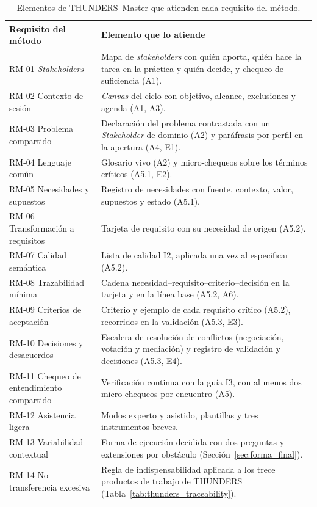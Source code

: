 \documentclass[12pt,letterpaper,oneside]{report}
\begin{document}
\begin{table}[H]
\caption{Elementos de THUNDERS~Master que atienden cada requisito del método.}
\label{tab:soporte_rm}
\centering
\footnotesize
\renewcommand{\arraystretch}{1.12}
\begin{tabularx}{\textwidth}{@{}L{4.4cm}Y@{}}
\toprule
\textbf{Requisito del método} & \textbf{Elemento que lo atiende} \\
\midrule
RM-01 \textit{Stakeholders} & Mapa de \textit{stakeholders} con quién aporta,
quién hace la tarea en la práctica y quién decide, y chequeo de suficiencia
(A1). \\
RM-02 Contexto de sesión & \textit{Canvas} del ciclo con objetivo, alcance,
exclusiones y agenda (A1, A3). \\
RM-03 Problema compartido & Declaración del problema contrastada con un \textit{Stakeholder} de dominio (A2)
y paráfrasis por perfil en la apertura (A4, E1). \\
RM-04 Lenguaje común & Glosario vivo (A2) y micro-chequeos sobre los términos
críticos (A5.1, E2). \\
RM-05 Necesidades y supuestos & Registro de necesidades con fuente, contexto,
valor, supuestos y estado (A5.1). \\
RM-06 Transformación a requisitos & Tarjeta de requisito con su necesidad de
origen (A5.2). \\
RM-07 Calidad semántica & Lista de calidad I2, aplicada una vez al especificar
(A5.2). \\
RM-08 Trazabilidad mínima & Cadena necesidad--requisito--criterio--decisión en
la tarjeta y en la línea base (A5.2, A6). \\
RM-09 Criterios de aceptación & Criterio y ejemplo de cada requisito crítico
(A5.2), recorridos en la validación (A5.3, E3). \\
RM-10 Decisiones y desacuerdos & Escalera de resolución de conflictos (negociación, votación y mediación)
y registro de validación y decisiones (A5.3, E4). \\
RM-11 Chequeo de entendimiento compartido & Verificación continua con la guía I3, con al
menos dos micro-chequeos por encuentro (A5). \\
RM-12 Asistencia ligera & Modos experto y asistido, plantillas y
tres instrumentos breves. \\
RM-13 Variabilidad contextual & Forma de ejecución decidida con dos preguntas y
extensiones por obstáculo (Sección~\ref{sec:forma_final}). \\
RM-14 No transferencia excesiva & Regla de indispensabilidad aplicada a los
trece productos de trabajo de THUNDERS (Tabla~\ref{tab:thunders_traceability}). \\
\bottomrule
\end{tabularx}
\end{table}
\end{document}
